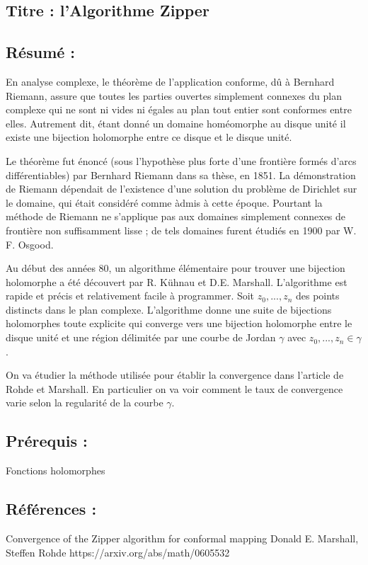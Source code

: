 \documentclass[]{article}
\date{}
\begin{document}
\subsection{Titre : l'Algorithme Zipper}\label{titre-lalgorithme-zipper}

\subsection{Résumé :}\label{ruxe9sumuxe9}

En analyse complexe, le théorème de l'application conforme, dû à
Bernhard Riemann, assure que toutes les parties ouvertes simplement
connexes du plan complexe qui ne sont ni vides ni égales au plan tout
entier sont conformes entre elles. Autrement dit, étant donné un domaine
homéomorphe au disque unité il existe une bijection holomorphe entre ce
disque et le disque unité.

Le théorème fut énoncé (sous l'hypothèse plus forte d'une frontière
formés d'arcs différentiables) par Bernhard Riemann dans sa thèse, en
1851. La démonstration de Riemann dépendait de l'existence d'une
solution du problème de Dirichlet sur le domaine, qui était considéré
comme àdmis à cette époque. Pourtant la méthode de Riemann ne s'applique
pas aux domaines simplement connexes de frontière non suffisamment lisse
; de tels domaines furent étudiés en 1900 par W. F. Osgood.

Au début des années 80, un algorithme élémentaire pour trouver une
bijection holomorphe a été découvert par R. Kühnau et D.E. Marshall.
L'algorithme est rapide et précis et relativement facile à programmer.
Soit \(z_0, ..., z_n\) des points distincts dans le plan complexe.
L'algorithme donne une suite de bijections holomorphes toute explicite
qui converge vers une bijection holomorphe entre le disque unité et une
région délimitée par une courbe de Jordan \(\gamma\) avec
\(z_0, ..., z_n \in \gamma\).

On va étudier la méthode utilisée pour établir la convergence dans
l'article de Rohde et Marshall. En particulier on va voir comment le
taux de convergence varie selon la regularité de la courbe \(\gamma\).

\subsection{Prérequis :}\label{pruxe9requis}

Fonctions holomorphes

\subsection{Références :}\label{ruxe9fuxe9rences}

Convergence of the Zipper algorithm for conformal mapping Donald E.
Marshall, Steffen Rohde https://arxiv.org/abs/math/0605532
\end{document}
